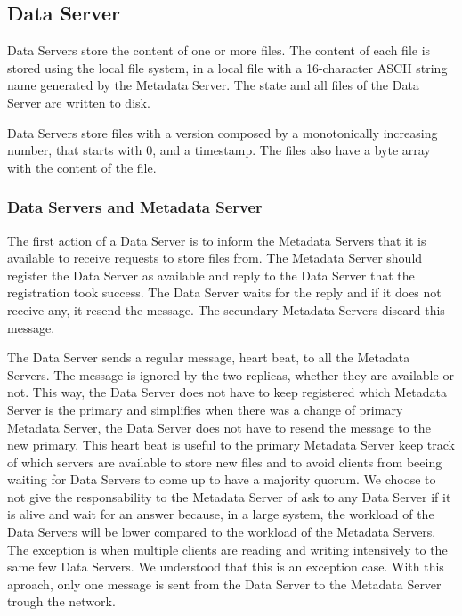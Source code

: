 \subsection{Data Server}

Data Servers store the content of one or more files. The content of each
file is stored using the local file system, in a local file with a
16-character ASCII string name generated by the Metadata Server. The
state and all files of the Data Server are written to disk.

Data Servers store files with a version composed by a
monotonically increasing number, that starts with 0, and a timestamp.
The files also have a byte array with the content of the file.

\subsubsection{Data Servers and Metadata Server}

The first action of a Data Server is to inform the Metadata Servers that
it is available to receive requests to store files from. The Metadata
Server should register the Data Server as available and reply to the Data
Server that the registration took success. The Data Server waits for the
reply and if it does not receive any, it resend the message. The secundary
Metadata Servers discard this message.

The Data Server sends a regular message, heart beat, to all the Metadata
Servers. The message is ignored by the two replicas, whether they are
available or not. This way, the Data Server does not have to keep
registered which Metadata Server is the primary and simplifies when
there was a change of primary Metadata Server, the Data Server does not
have to resend the message to the new primary.
This heart beat is useful to the primary Metadata Server keep track of
which servers are available to store new files and to avoid clients
from beeing waiting for Data Servers to come up to have a majority quorum.
We choose to not give the responsability to the Metadata Server of ask to
any Data Server if it is alive and wait for an answer because, in a large
system, the workload of the Data Servers will be lower compared to the
workload of the Metadata Servers. The exception is when multiple clients
are reading and writing intensively to the same few Data Servers. We
understood that this is an exception case. With this aproach, only one
message is sent from the Data Server to the Metadata Server trough the
network.

